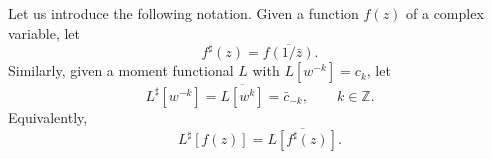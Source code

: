 \documentclass[reqno,centertags,11pt,draft]{amsart}
\newtheorem{prop}[thm]{Proposition}
\newcommand{\Z}{\mathbb{Z}}
\begin{document}


Let us introduce the following notation. Given a function $f(z)$ of a complex variable, let
\begin{equation}\label{eq:sharp1}
        f^\sharp(z) = \overline{f(1/\bar{z})}.
\end{equation}
Similarly, given a moment functional $L$ with $L[w^{-k}] = c_k$, let
\begin{equation}\label{eq:sharp2}
        L^\sharp[w^{-k}] = \overline{L[w^k]} = \bar{c}_{-k}, \qquad k\in\Z.
\end{equation}
Equivalently,
\begin{equation}\label{eq:sharp3}
    L^\sharp[f(z)] = \overline{L[f^\sharp(z)]}.
\end{equation}
\end{document}
